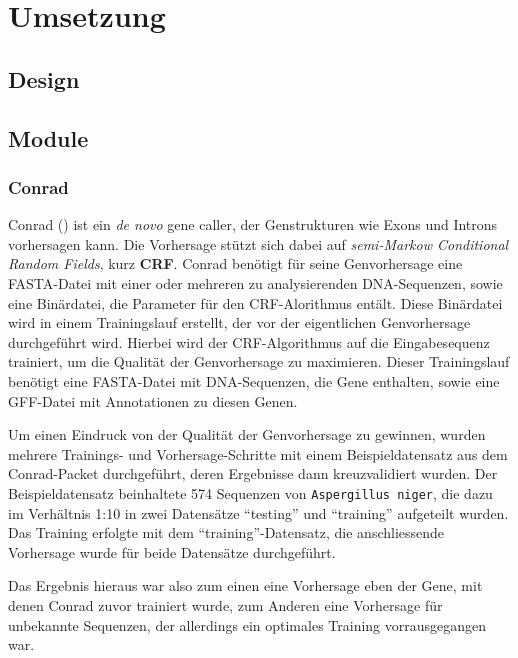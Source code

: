 \chapter{Umsetzung}
\section{Design}
\section{Module}
\subsection{Conrad}
Conrad
()
ist ein \textit{de novo} gene caller, der Genstrukturen wie Exons und Introns
vorhersagen kann.
 
Die Vorhersage stützt sich dabei auf \textit{semi-Markow Conditional Random
Fields}, kurz \textbf{CRF}.  %
  
Conrad benötigt für seine Genvorhersage eine FASTA-Datei mit einer oder
mehreren zu analysierenden DNA-Sequenzen, sowie eine Binärdatei, die Parameter
für den CRF-Alorithmus entält.
Diese Binärdatei wird in einem Trainingslauf erstellt, der vor der
eigentlichen Genvorhersage durchgeführt wird. Hierbei wird der CRF-Algorithmus
auf die Eingabesequenz trainiert, um die Qualität der Genvorhersage
zu maximieren. Dieser Trainingslauf benötigt eine FASTA-Datei mit
DNA-Sequenzen, die Gene enthalten, sowie eine GFF-Datei mit Annotationen zu
diesen Genen.

Um einen Eindruck von der Qualität der Genvorhersage zu gewinnen, wurden
mehrere Trainings- und Vorhersage-Schritte mit einem Beispieldatensatz aus dem
Conrad-Packet durchgeführt, deren Ergebnisse dann kreuzvalidiert wurden.
Der Beispieldatensatz beinhaltete 574 Sequenzen von \texttt{Aspergillus niger},
die dazu im Verhältnis 1:10 in zwei Datensätze \enquote{testing} und
\enquote{training} aufgeteilt wurden. Das Training erfolgte mit dem
\enquote{training}-Datensatz, die anschliessende Vorhersage wurde für beide
Datensätze durchgeführt.

Das Ergebnis hieraus war also zum einen eine Vorhersage eben der Gene, mit
denen Conrad zuvor trainiert wurde, zum Anderen eine Vorhersage für unbekannte
Sequenzen, der allerdings ein optimales Training vorrausgegangen war.

